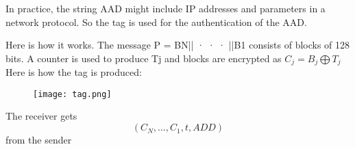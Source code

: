 \documentclass{article}
\begin{document}
In practice, the string AAD might include IP addresses and parameters in a network protocol.
So the tag is used for the authentication of the AAD.

\vspace{1cm}
Here is how it works. The message P = BN|| · · · ||B1 consists of blocks of 128 bits. A counter
is used to produce Tj and blocks are encrypted as ${C_j = B_j \bigoplus T_j}$\\
Here is how the tag is produced:

\begin{figure}[htp]
    \centering
    \texttt{[image: tag.png]}
\end{figure}
The receiver gets $${(C_N,...,C_1,t,ADD)}$$
from the sender
\end{document}
